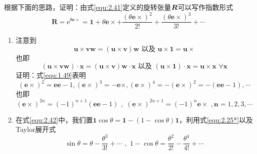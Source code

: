 \begin{exercise}
\begin{enumerate}
    \end{enumerate}
    \item 根据下面的思路，证明：由式\eqref{equ:2.41}定义的旋转张量$\boldsymbol{R}$可以写作指数形式
    \begin{equation}\label{equ:2.45}
        \boldsymbol{R}=\mathrm{e}^{\theta \boldsymbol{e}\times}=\mathbf{1}+\theta \boldsymbol{e}\times +\frac{\left( \theta \boldsymbol{e}\times \right) ^2}{2!}+\frac{\left( \theta \boldsymbol{e}\times \right) ^3}{3!}+\cdots 
    \end{equation}
    \begin{enumerate}
        \item 注意到
        \begin{equation}
            \boldsymbol{u}\times \boldsymbol{vw}=\left( \boldsymbol{u}\times \boldsymbol{v} \right) \boldsymbol{w}\,\, \text{以及} \,\, \boldsymbol{u}\times \mathbf{1}=\boldsymbol{u}\times 
        \end{equation}
        也即
        \begin{equation*}
            \left( \boldsymbol{u}\times \boldsymbol{vw} \right) \cdot \boldsymbol{x}=\left( \boldsymbol{u}\times \boldsymbol{v} \right) \boldsymbol{w}\cdot \boldsymbol{x}\,\, \text{以及} \,\, \left( \boldsymbol{u}\times \mathbf{1} \right) \cdot \boldsymbol{x}=\boldsymbol{u}\times \boldsymbol{x}\,\, \forall \boldsymbol{x}
        \end{equation*}
        证明：式\eqref{equ:1.49}表明
        \begin{equation*}
            \left( \boldsymbol{e}\times \right) ^2=\boldsymbol{ee}-1,\left( \boldsymbol{e}\times \right) ^3=-\boldsymbol{e}\times ,\left( \boldsymbol{e}\times \right) ^4=-\left( \boldsymbol{e}\times \right) ^2=-\left( \boldsymbol{ee}-1 \right) ,\cdots 
        \end{equation*}
        也即
        \begin{equation}\label{equ:2.25*}
            \left( \boldsymbol{e}\times \right) ^{2n}=\left( -1 \right) ^{n+1}\left( \boldsymbol{ee}-1 \right) \,\, , \,\, \left( \boldsymbol{e}\times \right) ^{2n+1}=\left( -1 \right) ^n\boldsymbol{e}\times \,\, ,\boldsymbol{n}=1,2,3,\cdots \tag{*}
        \end{equation}
        \item 在式\eqref{equ:2.42}中，我们置$\mathbf{1}\cos \theta =\mathbf{1}-\left( 1-\cos \theta \right) \mathbf{1}$，利用式\eqref{equ:2.25*}以及Taylor展开式
        \begin{equation*}
            \sin \theta =\theta -\frac{\theta ^3}{3!}+\cdots \,\, , \,\, 1-\cos \theta =\frac{\theta ^2}{2!}-\frac{\theta ^4}{4!}+\cdots 

\end{equation*}
\end{enumerate}
\end{exercise}
